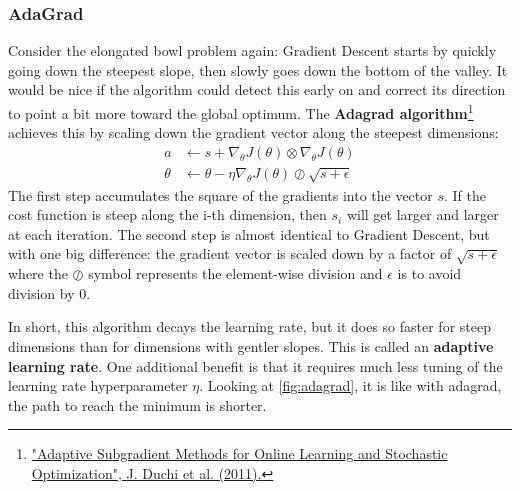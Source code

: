 \documentclass[12pt, letterpaper]{article}
\theoremstyle{definition}
\let\tb\textbf
\begin{document}
\subsubsection{AdaGrad}
Consider the elongated bowl problem again: Gradient Descent starts by quickly going down the steepest slope, then slowly goes down the bottom of the valley. It would be nice if the algorithm could detect this early on and correct its direction to point a bit more toward the global optimum. The \tb{Adagrad algorithm}\footnote{\href{https://homl.info/56}{"Adaptive Subgradient Methods for Online Learning and Stochastic Optimization", J. Duchi et al. (2011).}} achieves this by scaling down the gradient vector along the steepest dimensions:
\begin{equation}
\begin{aligned}
a &\leftarrow s + \nabla_\theta J(\theta) \otimes \nabla_\theta J(\theta)\\
\theta &\leftarrow \theta - \eta  \nabla_\theta J(\theta) \oslash \sqrt{s+\epsilon}
\end{aligned}
\end{equation}
The first step accumulates the square of the gradients into the vector $s$. If the cost function is steep along the i-th dimension, then $s_i$ will get larger and larger at each iteration. The second step is almost identical to Gradient Descent, but with one big difference: the gradient vector is scaled down by a factor of $\sqrt{s+\epsilon}$ where the $\oslash$ symbol represents the element-wise division and $\epsilon$ is to avoid division by $0$.

In short, this algorithm decays the learning rate, but it does so faster for steep dimensions than for dimensions with gentler slopes. This is called an \tb{adaptive learning rate}. One additional benefit is that it requires much less tuning of the learning rate hyperparameter $\eta$. Looking at \autoref{fig:adagrad}, it is like with adagrad, the path to reach the minimum is shorter.
\end{document}
